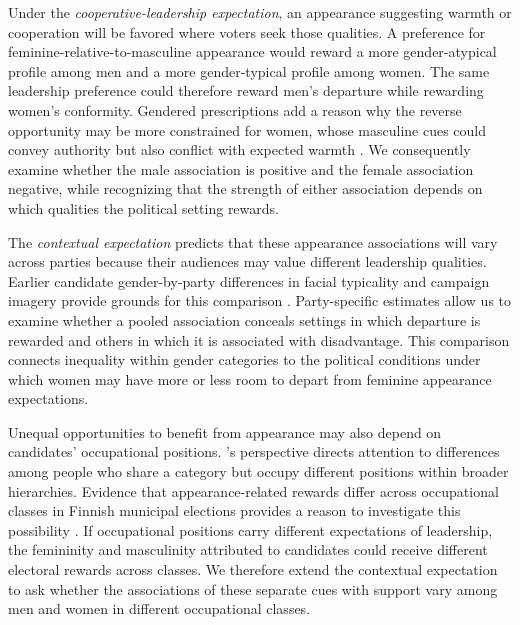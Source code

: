 \documentclass[11pt,a4paper]{article}\usepackage[]{graphicx}\usepackage[]{xcolor}
\begin{document}
Under the \emph{cooperative-leadership expectation}, an appearance suggesting warmth or cooperation will be favored where voters seek those qualities. A preference for feminine-relative-to-masculine appearance would reward a more gender-atypical profile among men and a more gender-typical profile among women. The same leadership preference could therefore reward men's departure while rewarding women's conformity. Gendered prescriptions add a reason why the reverse opportunity may be more constrained for women, whose masculine cues could convey authority but also conflict with expected warmth \parencite{Eagly2002,RudmanGlick2001}. We consequently examine whether the male association is positive and the female association negative, while recognizing that the strength of either association depends on which qualities the political setting rewards.

The \emph{contextual expectation} predicts that these appearance associations will vary across parties because their audiences may value different leadership qualities. Earlier candidate gender-by-party differences in facial typicality and campaign imagery provide grounds for this comparison \parencite{Carpinella2016,Park2023}. Party-specific estimates allow us to examine whether a pooled association conceals settings in which departure is rewarded and others in which it is associated with disadvantage. This comparison connects inequality within gender categories to the political conditions under which women may have more or less room to depart from feminine appearance expectations.

Unequal opportunities to benefit from appearance may also depend on candidates' occupational positions. \textcite{Monk2022}'s perspective directs attention to differences among people who share a category but occupy different positions within broader hierarchies. Evidence that appearance-related rewards differ across occupational classes in Finnish municipal elections provides a reason to investigate this possibility \parencite{Bahamonde2024}. If occupational positions carry different expectations of leadership, the femininity and masculinity attributed to candidates could receive different electoral rewards across classes. We therefore extend the contextual expectation to ask whether the associations of these separate cues with support vary among men and women in different occupational classes.
\end{document}
